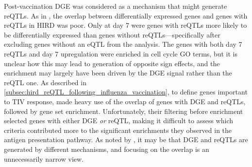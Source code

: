Post-vaccination \gls{DGE} was considered as a mechanism that might generate \glspl{reQTL}.
As in \textcite{kim-hellmuth2017GeneticRegulatoryEffects, davenport2018DiscoveringVivoCytokineeQTL}, the overlap between differentially expressed genes and genes with \glspl{reQTL} in \gls{HIRD} was poor.
Only at day 7 were genes with \glspl{reQTL} more likely to be differentially expressed than genes without \glspl{reQTL}---specifically after excluding genes without an \gls{eQTL} from the analysis.
The genes with both day 7 \glspl{reQTL} and day 7 upregulation were enriched in cell cycle \gls{GO} terms, but it is unclear how this may lead to generation of opposite sign effects, and the enrichment may largely have been driven by the \gls{DGE} signal rather than the \gls{reQTL} one.
As described in \cref{subsec:hird_reQTL_following_influenza_vaccination},
to define genes important to \gls{TIV} response,
\textcite{franco2013IntegrativeGenomicAnalysis} made heavy use of the overlap of genes with \gls{DGE} and \glspl{reQTL}, followed by gene set enrichment.
Unfortunately, their filtering before enrichment selected genes with either \gls{DGE} \emph{or} \gls{reQTL}, 
making it difficult to assess which criteria contributed more to the significant enrichments they observed in the antigen presentation pathway.
As noted by \textcite{davenport2018DiscoveringVivoCytokineeQTL,cuomo2020SinglecellRNAsequencingDifferentiating}, 
it may be that \gls{DGE} and \glspl{reQTL} are generated by different mechanisms, and focusing on the overlap is an unnecessarily narrow view. 


